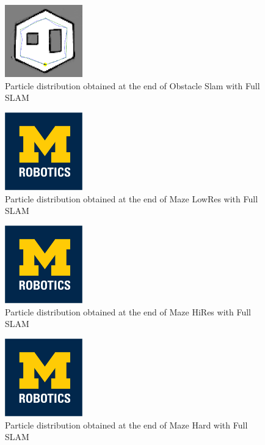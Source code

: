 \documentclass[journal,twocolumn]{IEEEtran}
\begin{document}
\begin{figure}[H]
\centering
\includegraphics[width=0.3\textwidth]{Media/131.png}
\caption{Particle distribution obtained at the end of Obstacle Slam with Full SLAM}
\end{figure}

\begin{figure}[H]
\centering
\includegraphics[width=0.3\textwidth]{Media/template-robotics.jpg}
\caption{Particle distribution obtained at the end of Maze LowRes with Full SLAM}
\end{figure}

\begin{figure}[H]
\centering
\includegraphics[width=0.3\textwidth]{Media/template-robotics.jpg}
\caption{Particle distribution obtained at the end of Maze HiRes with Full SLAM}
\end{figure}

\begin{figure}[H]
\centering
\includegraphics[width=0.3\textwidth]{Media/template-robotics.jpg}
\caption{Particle distribution obtained at the end of Maze Hard with Full SLAM}
\end{figure}
\end{document}
